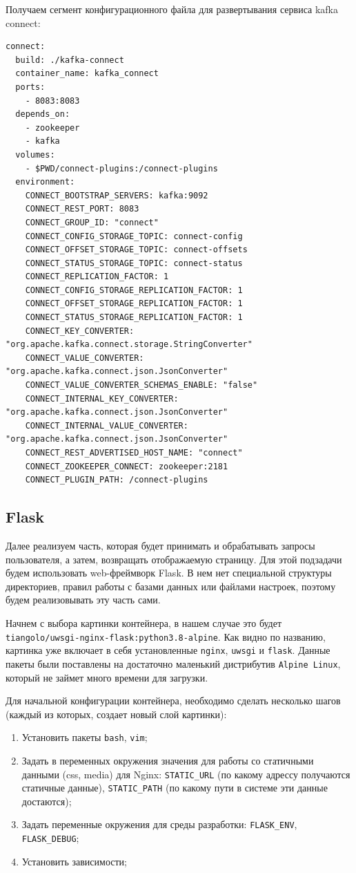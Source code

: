 Получаем сегмент конфигурационного файла для развертывания сервиса kafka
connect:
\begin{verbatim}
connect:
  build: ./kafka-connect
  container_name: kafka_connect
  ports:
    - 8083:8083
  depends_on:
    - zookeeper
    - kafka
  volumes:
    - $PWD/connect-plugins:/connect-plugins
  environment:
    CONNECT_BOOTSTRAP_SERVERS: kafka:9092
    CONNECT_REST_PORT: 8083
    CONNECT_GROUP_ID: "connect"
    CONNECT_CONFIG_STORAGE_TOPIC: connect-config
    CONNECT_OFFSET_STORAGE_TOPIC: connect-offsets
    CONNECT_STATUS_STORAGE_TOPIC: connect-status
    CONNECT_REPLICATION_FACTOR: 1
    CONNECT_CONFIG_STORAGE_REPLICATION_FACTOR: 1
    CONNECT_OFFSET_STORAGE_REPLICATION_FACTOR: 1
    CONNECT_STATUS_STORAGE_REPLICATION_FACTOR: 1
    CONNECT_KEY_CONVERTER: "org.apache.kafka.connect.storage.StringConverter"
    CONNECT_VALUE_CONVERTER: "org.apache.kafka.connect.json.JsonConverter"
    CONNECT_VALUE_CONVERTER_SCHEMAS_ENABLE: "false"
    CONNECT_INTERNAL_KEY_CONVERTER: "org.apache.kafka.connect.json.JsonConverter"
    CONNECT_INTERNAL_VALUE_CONVERTER: "org.apache.kafka.connect.json.JsonConverter"
    CONNECT_REST_ADVERTISED_HOST_NAME: "connect"
    CONNECT_ZOOKEEPER_CONNECT: zookeeper:2181
    CONNECT_PLUGIN_PATH: /connect-plugins
\end{verbatim}


\subsection{Flask}
Далее реализуем часть, которая будет принимать и обрабатывать запросы
пользователя, а затем, возвращать отображаемую страницу. Для этой подзадачи
будем использовать web-фреймворк Flask. В нем нет специальной структуры
директориев, правил работы с базами данных или файлами настроек, поэтому будем
реализовывать эту часть сами.

Начнем с выбора картинки контейнера, в нашем случае это будет
\verb|tiangolo/uwsgi-nginx-flask:python3.8-alpine|. Как видно по названию,
картинка уже включает в себя установленные \verb|nginx|, \verb|uwsgi| и
\verb|flask|. Данные пакеты были поставлены на достаточно маленький дистрибутив
\verb|Alpine Linux|, который не займет много времени для загрузки.

Для начальной конфигурации контейнера, необходимо сделать несколько шагов
(каждый из которых, создает новый слой картинки):
\begin{enumerate}[label=\arabic*.]
    \item Установить пакеты \verb|bash|, \verb|vim|;
    \item Задать в переменных окружения значения для работы со статичными
        данными (css, media) для Nginx: \verb|STATIC_URL| (по какому адрессу
        получаются статичные данные), \verb|STATIC_PATH| (по какому пути в
        системе эти данные достаются);
    \item Задать переменные окружения для среды разработки: \verb|FLASK_ENV|, \verb|FLASK_DEBUG|;
    \item Установить зависимости;
\end{enumerate}

